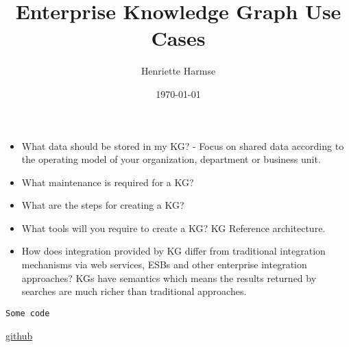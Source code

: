 \documentclass{amsart}
\title{Enterprise Knowledge Graph Use Cases}
\author{Henriette Harmse}
\date{\today}
\begin{document}
  \maketitle
  
\begin{itemize}
	\item What data should be stored in my KG? - Focus on shared data according to the operating model of your organization, department or business unit.
	\item What maintenance is required for a KG?
	\item What are the steps for creating a KG?
	\item What tools will you require to create a KG? KG Reference architecture. 
	\item How does integration provided by KG differ from traditional integration mechanisms via web services, ESBs and other enterprise integration approaches? KGs have semantics which means the results returned by searches are much richer than traditional approaches.
\end{itemize} 



  
  
  \cite{Aameri2015}

\begin{small}
\begin{verbatim} 
Some code
\end{verbatim}
\end{small}

\href{http://}{github}
  
  
  
 
\end{document}
